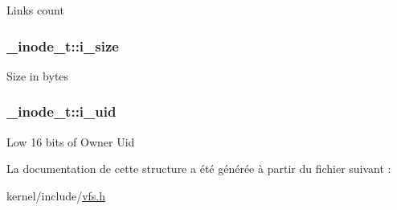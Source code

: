 Links count \hypertarget{struct__inode__t_aed37b31c96c90873201abfc8b4b3e463}{
\subsubsection[{i\+\_\+size}]{ \+\_\+inode\+\_\+t\+::i\+\_\+size}}\label{struct__inode__t_aed37b31c96c90873201abfc8b4b3e463}
Size in bytes \hypertarget{struct__inode__t_a7ddcb65050ac0b4c9cfbacd495d56f4b}{
\subsubsection[{i\+\_\+uid}]{ \+\_\+inode\+\_\+t\+::i\+\_\+uid}}\label{struct__inode__t_a7ddcb65050ac0b4c9cfbacd495d56f4b}
Low 16 bits of Owner Uid 

La documentation de cette structure a été générée à partir du fichier suivant \+:\begin{DoxyCompactItemize}
\item 
kernel/include/\hyperlink{vfs_8h}{vfs.\+h}\end{DoxyCompactItemize}

